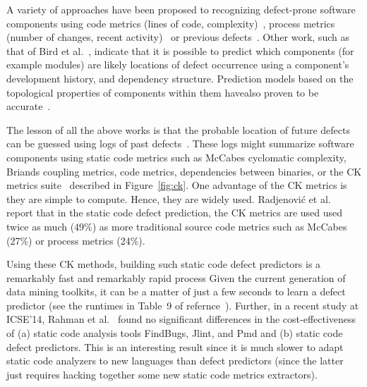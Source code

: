 \documentclass[10pt,conference]{IEEEtran}
\theoremstyle{break}
\theoremstyle{break}
\begin{document}
A variety of approaches have been proposed to recognizing
 defect-prone  software components using code metrics (lines of code, complexity)~\cite{d2010extensive,menzies2007data, nagappan2006mining,shepperd2014researcher,Menzies2010}, process metrics (number of changes, recent activity)~\cite{hassan2009predicting} or previous defects~\cite{kim2007predicting}.
Other work, such as that of 
Bird et al.~\cite{bird2009putting}, indicate that it is possible to predict which components (for example modules) are likely locations of
defect occurrence using a component's development history,
and dependency structure. 
Prediction models based on the topological properties
of components within them havealso  proven to be  
accurate~\cite{zimmermann2008predicting}.

The lesson of all the above works is that the probable location
of future defects can be guessed using   logs of past defects~\cite{hall2012systematic, catal2009systematic}. These logs might
summarize software components using
static code metrics such as 
McCabes  cyclomatic  complexity, Briands coupling metrics, code metrics,  
dependencies between  binaries, or
the  CK  metrics  suite~\cite{chidamber1994metrics} described in  Figure~\ref{fig:ck}. 
One advantage of the CK metrics is they are  simple  to  compute. Hence,
they are widely used. Radjenovi{\'c} et al.~\cite{radjenovic2013software} report that in
the static code defect prediction, the CK metrics are used
used  twice as much (49\%) 
as more traditional source code metrics such as McCabes (27\%) or process metrics (24\%).

Using these CK methods, building such static code defect predictors is a remarkably fast and remarkably rapid process
Given the current generation of data mining toolkits, it can be a matter
of just a few seconds to learn a defect predictor (see the runtimes in Table~9 of refernce~\cite{fu2016tuning}). Further, in a recent study at ICSE'14, Rahman et
al.~\cite{Rahman14} found no significant differences in the cost-effectiveness
of
(a) static code analysis tools FindBugs, Jlint,
and Pmd and (b) static code defect predictors.
This is an interesting result since it is  much slower to adapt static code
analyzers to new  languages than defect predictors (since the latter just requires hacking together some new
static code metrics extractors).
\end{document}
